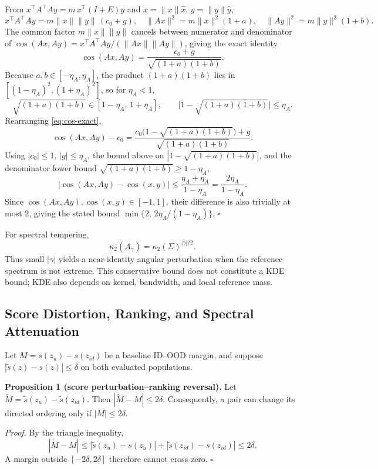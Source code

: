\documentclass[pdflatex,sn-basic]{sn-jnl}
\theoremstyle{plain}
\theoremstyle{definition}
\theoremstyle{remark}
\begin{document}
From $x^\top A^\top Ay=m\,x^\top(I+E)y$ and $x=\|x\|\hat x$, $y=\|y\|\hat y$,
\[
x^\top A^\top A y = m\|x\|\|y\|\,(c_0+g),\quad
\|Ax\|^2=m\|x\|^2(1+a),\quad
\|Ay\|^2=m\|y\|^2(1+b).
\]
The common factor $m\|x\|\|y\|$ cancels between numerator and denominator of
$\cos(Ax,Ay)=x^\top A^\top Ay/(\|Ax\|\|Ay\|)$, giving the exact identity
\begin{equation}
\cos(Ax,Ay)=\frac{c_0+g}{\sqrt{(1+a)(1+b)}}.
\label{eq:cos-exact}
\end{equation}
Because $a,b\in[-\eta_A,\eta_A]$, the product $(1+a)(1+b)$ lies in
$[(1-\eta_A)^2,(1+\eta_A)^2]$, so for $\eta_A<1$,
\[
\sqrt{(1+a)(1+b)}\in[1-\eta_A,\,1+\eta_A],
\qquad
\big|1-\sqrt{(1+a)(1+b)}\big|\le\eta_A.
\]
Rearranging \eqref{eq:cos-exact},
\[
\cos(Ax,Ay)-c_0
=\frac{c_0\big(1-\sqrt{(1+a)(1+b)}\big)+g}{\sqrt{(1+a)(1+b)}}.
\]
Using $|c_0|\le1$, $|g|\le\eta_A$, the bound above on
$|1-\sqrt{(1+a)(1+b)}|$, and the denominator lower bound
$\sqrt{(1+a)(1+b)}\ge1-\eta_A$,
\[
\big|\cos(Ax,Ay)-\cos(x,y)\big|
\le\frac{\eta_A+\eta_A}{1-\eta_A}
=\frac{2\eta_A}{1-\eta_A}.
\]
Since $\cos(Ax,Ay),\cos(x,y)\in[-1,1]$, their difference is also trivially
at most $2$, giving the stated bound
$\min\{2,\,2\eta_A/(1-\eta_A)\}$. \hfill$\square$

For spectral tempering,
\begin{equation}
\kappa_2(A_\gamma)=\kappa_2(\Sigma)^{|\gamma|/2}.
\end{equation}
Thus small $|\gamma|$ yields a near-identity angular perturbation when the reference spectrum is not extreme. This conservative bound does not constitute a KDE bound; KDE also depends on kernel, bandwidth, and local reference mass.

\subsection{Score Distortion, Ranking, and Spectral Attenuation}
Let $M=s(z_u)-s(z_{id})$ be a baseline ID--OOD margin, and suppose $|\widetilde{s}(z)-s(z)|\le\delta$ on both evaluated populations.

\textbf{Proposition 1 (score perturbation--ranking reversal).} Let $\widetilde{M}=\widetilde{s}(z_u)-\widetilde{s}(z_{id})$. Then $|\widetilde{M}-M|\le2\delta$. Consequently, a pair can change its directed ordering only if $|M|\le2\delta$.

\emph{Proof.} By the triangle inequality,
\begin{equation}
|\widetilde{M}-M|
\le |\widetilde{s}(z_u)-s(z_u)|
 +|\widetilde{s}(z_{id})-s(z_{id})|
\le2\delta.
\end{equation}
A margin outside $[-2\delta,2\delta]$ therefore cannot cross zero. \hfill$\square$
\end{document}
